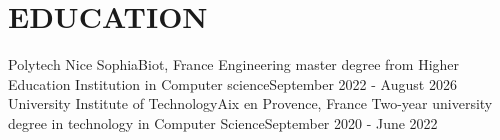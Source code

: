 \section{\color{airforceblue}EDUCATION}
\resumeSubHeadingListStart
\resumeSubheading
{Polytech Nice Sophia}{Biot, France}
{Engineering master degree from Higher Education Institution in Computer science}{September 2022 - August 2026}
\resumeSubheading
{University Institute of Technology}{Aix en Provence, France}
{Two-year university degree in technology in Computer Science}{September 2020 - June 2022}
\resumeSubHeadingListEnd
\vspace{-10pt}
